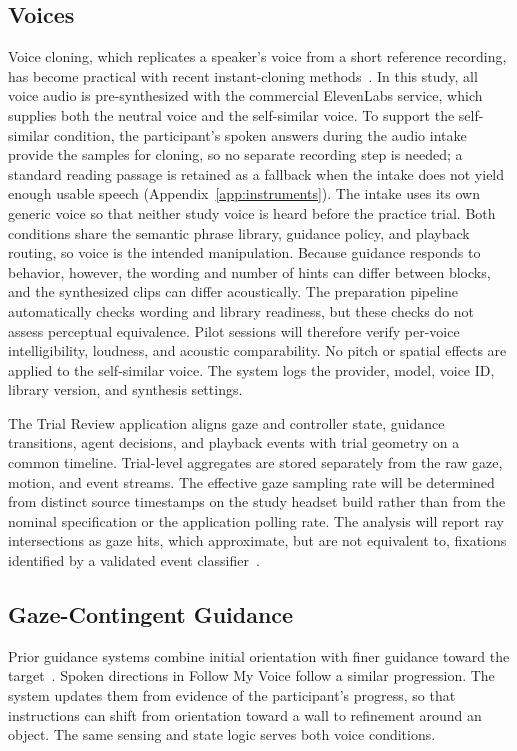 \subsection{Voices}
Voice cloning, which replicates a speaker's voice from a short reference recording, has become practical with recent instant-cloning methods~\cite{qin2023openvoice}. In this study, all voice audio is pre-synthesized with the commercial ElevenLabs service, which supplies both the neutral voice and the self-similar voice. To support the self-similar condition, the participant's spoken answers during the audio intake provide the samples for cloning, so no separate recording step is needed; a standard reading passage is retained as a fallback when the intake does not yield enough usable speech (Appendix~\ref{app:instruments}). The intake uses its own generic voice so that neither study voice is heard before the practice trial. Both conditions share the semantic phrase library, guidance policy, and playback routing, so voice is the intended manipulation. Because guidance responds to behavior, however, the wording and number of hints can differ between blocks, and the synthesized clips can differ acoustically. The preparation pipeline automatically checks wording and library readiness, but these checks do not assess perceptual equivalence. Pilot sessions will therefore verify per-voice intelligibility, loudness, and acoustic comparability. No pitch or spatial effects are applied to the self-similar voice. The system logs the provider, model, voice ID, library version, and synthesis settings.

The Trial Review application aligns gaze and controller state, guidance transitions, agent decisions, and playback events with trial geometry on a common timeline. Trial-level aggregates are stored separately from the raw gaze, motion, and event streams. The effective gaze sampling rate will be determined from distinct source timestamps on the study headset build rather than from the nominal specification or the application polling rate. The analysis will report ray intersections as gaze hits, which approximate, but are not equivalent to, fixations identified by a validated event classifier~\cite{salvucci2000fixations}.

\subsection{Gaze-Contingent Guidance}
Prior guidance systems combine initial orientation with finer guidance toward the target~\cite{kwok2022twostep,tanaka2026coarse}. Spoken directions in Follow My Voice follow a similar progression. The system updates them from evidence of the participant's progress, so that instructions can shift from orientation toward a wall to refinement around an object. The same sensing and state logic serves both voice conditions.


